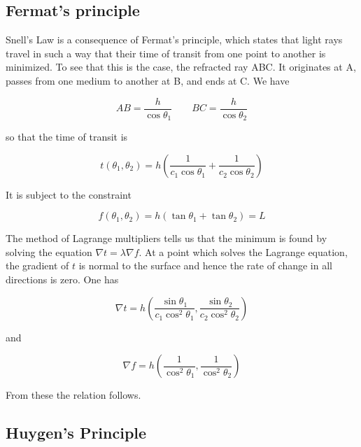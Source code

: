 \subsection{Fermat's principle}

 Snell's Law is a consequence of Fermat's principle, which states that light rays travel in such a way that their time of transit from one point to another is minimized. To see that this is the case, the refracted ray ABC.  It originates at A, passes from one medium to another at B, and ends at C. We have

\begin{equation}
AB = \frac{h}{\cos \theta_1} \qquad BC= \frac{h}{\cos \theta_2} 
\end{equation}

so that the time of transit is 

\begin{equation}
t(\theta_1, \theta_2) = h\left(  
\frac{1}{c_1\cos\theta_1}  + \frac{1}{c_2\cos\theta_2} \right)
\end{equation}

It is subject to the constraint

\begin{equation}
f(\theta_1, \theta_2)  = h(\tan\theta_1 + \tan\theta_2) = L
\end{equation}



The method of Lagrange multipliers tells us that the minimum is found by solving the equation $\nabla t = \lambda \nabla f$.  At a point which solves the Lagrange equation, the gradient of $t$ is normal to the surface and hence the rate of change in all directions is zero. One has 

\begin{equation}
\nabla t = h\left(\frac{\sin \theta_1}{c_1 \cos^2 \theta_1},
\frac{\sin \theta_2}{c_2 \cos^2 \theta_2}\right)
\end{equation}

and

\begin{equation}
\nabla f = h\left(\frac{1}{\cos^2 \theta_1},
\frac{1}{\cos^2 \theta_2}\right)
\end{equation}

From these the relation follows.




\subsection{Huygen's Principle}


